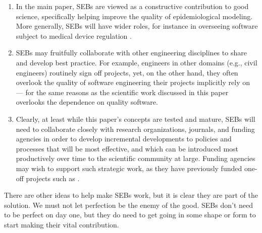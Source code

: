 \documentclass{article}
\begin{document}
\begin{enumerate}
\item
In the main paper, SEBs are viewed as a constructive contribution to good science, specifically helping improve the quality of epidemiological modeling. More generally, SEBs will have wider roles, for instance in overseeing software subject to medical device regulation \cite{fixit}.

\item
SEBs may fruitfully collaborate with other engineering disciplines to share and develop best practice. For example, engineers in other domains (e.g., civil engineers) routinely sign off projects, yet, on the other hand, they often overlook the quality of software engineering their projects implicitly rely on  --- for the same reasons as the scientific work discussed in this paper overlooks the dependence on quality software.

\item
Clearly, at least while this paper's concepts are tested and mature, SEBs will need to collaborate closely with research organizations, journals, and funding agencies in order to develop incremental developments to policies and processes that will be most effective, and which can be introduced most productively over time to the scientific community at large. Funding agencies may wish to support such strategic work, as they have previously funded one-off projects such as \cite{cosmos}.
\end{enumerate}
 
There are other ideas to help make SEBs work, but it is clear they are part of the solution. We must not let perfection be the enemy of the good. SEBs don't need to be perfect on day one, but they do need to get going in some shape or form to start making their vital contribution.

\end{document}
